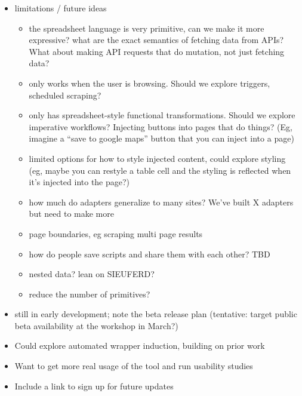 \documentclass[english,submission]{programming}
\providecommand{\tightlist}{%
  \setlength{\itemsep}{0pt}\setlength{\parskip}{0pt}}
\begin{document}
\begin{itemize}
\tightlist
\item
  limitations / future ideas

  \begin{itemize}
  \tightlist
  \item
    the spreadsheet language is very primitive, can we make it more
    expressive? what are the exact semantics of fetching data from APIs?
    What about making API requests that do mutation, not just fetching
    data?
  \item
    only works when the user is browsing. Should we explore triggers,
    scheduled scraping?
  \item
    only has spreadsheet-style functional transformations. Should we
    explore imperative workflows? Injecting buttons into pages that do
    things? (Eg, imagine a ``save to google maps'' button that you can
    inject into a page)
  \item
    limited options for how to style injected content, could explore
    styling (eg, maybe you can restyle a table cell and the styling is
    reflected when it's injected into the page?)
  \item
    how much do adapters generalize to many sites? We've built X
    adapters but need to make more
  \item
    page boundaries, eg scraping multi page results
  \item
    how do people save scripts and share them with each other? TBD
  \item
    nested data? lean on SIEUFERD?
  \item
    reduce the number of primitives?
  \end{itemize}
\item
  still in early development; note the beta release plan (tentative:
  target public beta availability at the workshop in March?)
\item
  Could explore automated wrapper induction, building on prior work
\item
  Want to get more real usage of the tool and run usability studies
\item
  Include a link to sign up for future updates
\end{itemize}

\acks
\printbibliography
\end{document}
